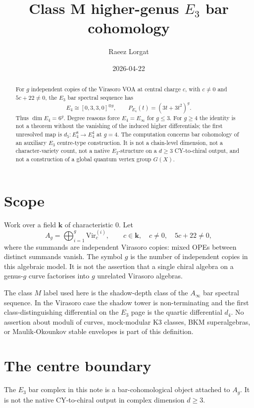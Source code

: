 \documentclass[11pt]{amsart}
\title{Class M higher-genus \(E_3\) bar cohomology}
\author{Raeez Lorgat}
\date{2026-04-22}
\theoremstyle{definition}
\providecommand{\kk}{\mathbf{k}}
\providecommand{\Vir}{\mathrm{Vir}}
\begin{document}
\maketitle

\begin{abstract}
For \(g\) independent copies of the Virasoro VOA at central charge
\(c\), with \(c \ne 0\) and \(5c+22 \ne 0\), the \(E_3\) bar spectral
sequence has
\[
  E_4 \cong [0,3,3,0]^{\otimes g},
  \qquad
  P_{E_4}(t) = (3t+3t^2)^g.
\]
Thus \(\dim E_4=6^g\). Degree reasons force \(E_4=E_\infty\) for
\(g\leq 3\). For \(g\geq4\) the identity is not a theorem without the
vanishing of the induced higher differentials; the first unresolved
map is \(d_5:E_4^8\to E_4^4\) at \(g=4\). The computation concerns
bar cohomology of an auxiliary \(E_3\) centre-type construction. It is
not a chain-level dimension, not a character-variety count, not a
native \(E_2\)-structure on a \(d\geq3\) CY-to-chiral output, and not a
construction of a global quantum vertex group \(G(X)\).
\end{abstract}

\section{Scope}

Work over a field \(\kk\) of characteristic \(0\). Let
\[
  A_g=\bigoplus_{i=1}^g \Vir_c^{(i)},
  \qquad c\in\kk,\quad c\ne0,\quad 5c+22\ne0,
\]
where the summands are independent Virasoro copies: mixed OPEs between
distinct summands vanish. The symbol \(g\) is the number of independent
copies in this algebraic model. It is not the assertion that a single
chiral algebra on a genus-\(g\) curve factorises into \(g\) unrelated
Virasoro algebras.

The class \(M\) label used here is the shadow-depth class of the
\(A_\infty\) bar spectral sequence. In the Virasoro case the shadow
tower is non-terminating and the first class-distinguishing differential
on the \(E_3\) page is the quartic differential \(d_4\). No assertion
about moduli of curves, mock-modular K3 classes, BKM superalgebras, or
Maulik-Okounkov stable envelopes is part of this definition.

\section{The centre boundary}

The \(E_3\) bar complex in this note is a bar-cohomological object
attached to \(A_g\). It is not the native CY-to-chiral output in
complex dimension \(d\geq3\).
\end{document}
